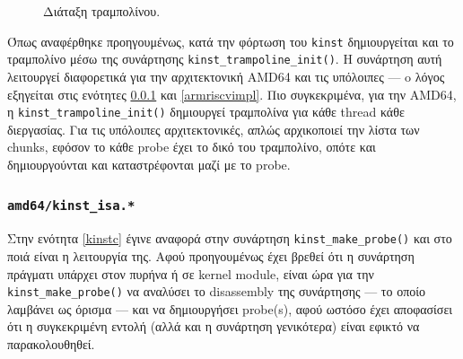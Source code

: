 \documentclass[12pt]{article}
\begin{document}
\begin{figure}[H]
\begin{center}
\caption{Διάταξη τραμπολίνου.}
\label{trampfig}
\end{center}
\end{figure}

Όπως αναφέρθηκε προηγουμένως, κατά την φόρτωση του \lstinline{kinst}
δημιουργείται και το τραμπολίνο μέσω της συνάρτησης
\lstinline{kinst_trampoline_init()}. Η συνάρτηση αυτή λειτουργεί διαφορετικά
για την αρχιτεκτονική AMD64 και τις υπόλοιπες --- o λόγος εξηγείται στις
ενότητες \ref{amdimpl} και \ref{armriscvimpl}. Πιο συγκεκριμένα, για την AMD64,
η \lstinline{kinst_trampoline_init()} δημιουργεί τραμπολίνα για κάθε thread
κάθε διεργασίας. Για τις υπόλοιπες αρχιτεκτονικές, απλώς αρχικοποιεί την λίστα
των chunks, εφόσον το κάθε probe έχει το δικό του τραμπολίνο, οπότε και
δημιουργούνται και καταστρέφονται μαζί με το probe.

\subsubsection{\lstinline{amd64/kinst_isa.*}} \label{amdimpl}

Στην ενότητα \ref{kinstc} έγινε αναφορά στην συνάρτηση
\lstinline{kinst_make_probe()} και στο ποιά είναι η λειτουργία της. Αφού
προηγουμένως έχει βρεθεί ότι η συνάρτηση πράγματι υπάρχει στον πυρήνα ή σε
kernel module, είναι ώρα για την \lstinline{kinst_make_probe()} να αναλύσει το
disassembly της συνάρτησης --- το οποίο λαμβάνει ως όρισμα --- και να
δημιουργήσει probe(s), αφού ωστόσο έχει αποφασίσει ότι η συγκεκριμένη εντολή
(αλλά και η συνάρτηση γενικότερα) είναι εφικτό να παρακολουθηθεί.
\end{document}
